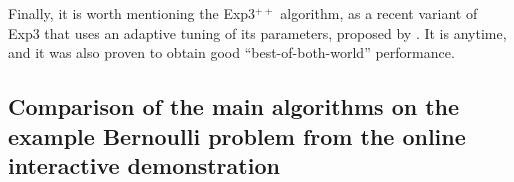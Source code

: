 %



Finally, it is worth mentioning the Exp3$^{++}$ algorithm, as a recent variant of Exp3 that uses an adaptive tuning of its parameters, proposed by \cite{Seldin17}.
It is anytime, and it was also proven to obtain good ``best-of-both-world'' performance.


\subsection{Comparison of the main algorithms on the example Bernoulli problem from the online interactive demonstration}
\label{sub:2:shortNumericalExperiments}

